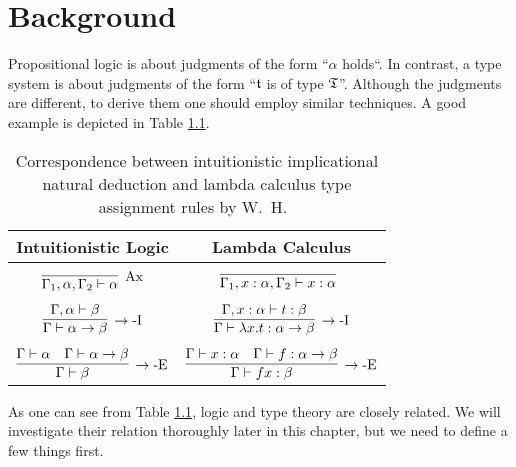 \chapter{Background}\label{chap:background}

Propositional logic is about judgments of the form ``$\alpha$ holds``. In contrast, a type system is about judgments of the form ``$\mathfrak{t}$ is of type $\mathfrak{T}$''. Although the judgments are different, to derive them one should employ similar techniques. A good example is depicted in Table \ref{tab:natural-deduction-lambda-calculus-correspondence}.

\begin{table}[!ht]
    \centering
    \begin{tabular}{c|c}
        Intuitionistic Logic & Lambda Calculus \\
        \hline \\
        $\infer[\mbox{Ax}]{\Gamma_1, \alpha, \Gamma_2 \vdash \alpha}{}$ & $\infer[]{\Gamma_1, x : \alpha, \Gamma_2 \vdash x : \alpha}{}$ \\ \\
        $\infer[\rightarrow\mbox{-I}]{\Gamma \vdash \alpha \rightarrow \beta}{\Gamma, \alpha \vdash \beta}$ & $\infer[\rightarrow\mbox{-I}]{\Gamma \vdash \lambda x. t : \alpha \rightarrow \beta}{\Gamma, x : \alpha \vdash t : \beta}$ \\ \\
        $\infer[\rightarrow\mbox{-E}]{\Gamma \vdash \beta}{\Gamma \vdash \alpha & \Gamma \vdash \alpha \rightarrow \beta}$ & $\infer[\rightarrow\mbox{-E}]{\Gamma \vdash f x : \beta}{\Gamma \vdash x : \alpha & \Gamma \vdash f : \alpha \rightarrow \beta}$
    \end{tabular}
    \caption{Correspondence between 
intuitionistic implicational natural deduction and lambda calculus type assignment rules by W.~H.~\cite{Howard1969TheFN}}
    \label{tab:natural-deduction-lambda-calculus-correspondence}
\end{table}

As one can see from Table \ref{tab:natural-deduction-lambda-calculus-correspondence}, logic and type theory are closely related. We will investigate their relation thoroughly later in this chapter, but we need to define a few things first.



